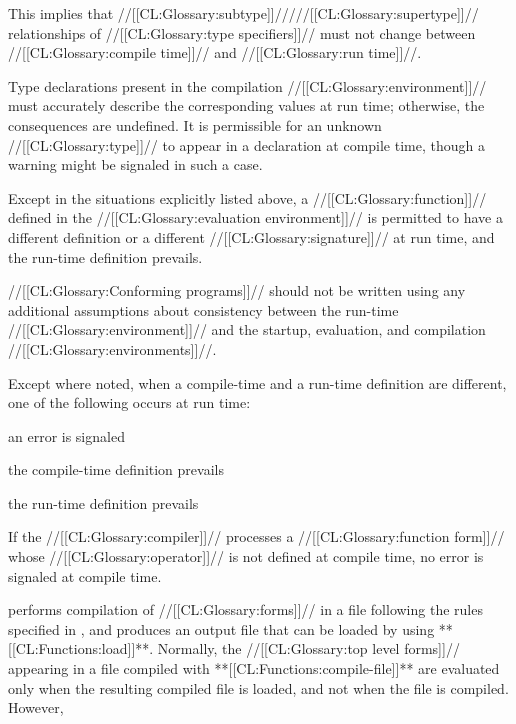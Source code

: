 This implies that //[[CL:Glossary:subtype]]/////[[CL:Glossary:supertype]]// relationships of  //[[CL:Glossary:type specifiers]]// must not change between //[[CL:Glossary:compile time]]// and //[[CL:Glossary:run time]]//.  
 

 \itemitem{\bull} Type declarations present in the compilation  //[[CL:Glossary:environment]]// must accurately describe the corresponding values at run time; otherwise, the consequences are undefined.  It is permissible for an unknown //[[CL:Glossary:type]]// to appear in a declaration at  compile time, though a warning might be signaled in such a case.

 \itemitem{\bull} Except in the situations explicitly listed above, a //[[CL:Glossary:function]]// defined in the //[[CL:Glossary:evaluation environment]]// is permitted to have a different definition or a different //[[CL:Glossary:signature]]// at run time, and the run-time definition prevails.

\endlist 

//[[CL:Glossary:Conforming programs]]// should not be written using any additional assumptions about consistency between the run-time  //[[CL:Glossary:environment]]// and the startup, evaluation, and compilation  //[[CL:Glossary:environments]]//.

Except where noted, when a compile-time and a run-time definition are different, one of the following occurs at run time:

\beginlist
                                                           \item{\bull} an error  is signaled \item{\bull} the compile-time definition prevails \item{\bull} the run-time definition prevails

\endlist
  If the //[[CL:Glossary:compiler]]// processes a //[[CL:Glossary:function form]]// whose //[[CL:Glossary:operator]]//  is not defined at compile time, no error is signaled at compile time.

\endsubsubsection%
   performs compilation of  //[[CL:Glossary:forms]]// in a file following the rules specified in \secref\CompilationSemantics, and produces an output file that can be loaded by using **[[CL:Functions:load]]**.
  Normally, the //[[CL:Glossary:top level forms]]// appearing in a file compiled with **[[CL:Functions:compile-file]]** are evaluated only when the resulting compiled file is loaded, and not when the file is compiled.  However,

